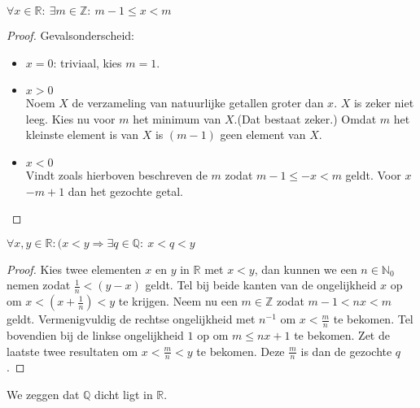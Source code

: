 \documentclass[main.tex]{subfiles}
\begin{document}
\begin{gev}
  \label{gev:z-omsluit-elk-r}
  $\forall x\in \mathbb{R}:\ \exists m \in \mathbb{Z}:\ m-1 \le x < m$

  \begin{proof}
    Gevalsonderscheid:
    \begin{itemize}
    \item $x = 0$: triviaal, kies $m=1$.
    \item $x > 0$\\
      Noem $X$ de verzameling van natuurlijke getallen groter dan $x$.
      $X$ is zeker niet leeg.
      Kies nu voor $m$ het minimum van $X$.(Dat bestaat zeker.) \waarom
      Omdat $m$ het kleinste element is van $X$ is $(m-1)$ geen element van $X$.
    \item $x < 0$\\
      Vindt zoals hierboven beschreven de $m$ zodat $m-1 \le -x < m$ geldt.
      Voor $x$ $-m+1$ dan het gezochte getal.\waarom
    \end{itemize}
  \end{proof}
\end{gev}

\begin{pr}
  $\forall x,y \in \mathbb{R}: (x<y \Rightarrow \exists q\in \mathbb{Q}:\ x<q<y$

  \begin{proof}
    Kies twee elementen $x$ en $y$ in $\mathbb{R}$ met $x<y$, dan kunnen we een $n\in \mathbb{N}_{0}$ nemen zodat $\frac{1}{n}< (y-x)$ geldt.
    Tel bij beide kanten van de ongelijkheid $x$ op om $x<\left(x+\frac{1}{n}\right)<y$ te krijgen.
    Neem nu een $m\in \mathbb{Z}$ zodat $m-1<nx<m$ geldt.
    Vermenigvuldig de rechtse ongelijkheid met $n^{-1}$ om $x< \frac{m}{n}$ te bekomen.
    Tel bovendien bij de linkse ongelijkheid $1$ op om $m \le nx+1$ te bekomen.
    Zet de laatste twee resultaten om $x < \frac{m}{n} < y$ te bekomen.
    Deze $\frac{m}{n}$ is dan de gezochte $q$.
  \end{proof}
\end{pr}

\begin{opm}
  We zeggen dat $\mathbb{Q}$ dicht ligt in $\mathbb{R}$.
\end{opm}
\end{document}
